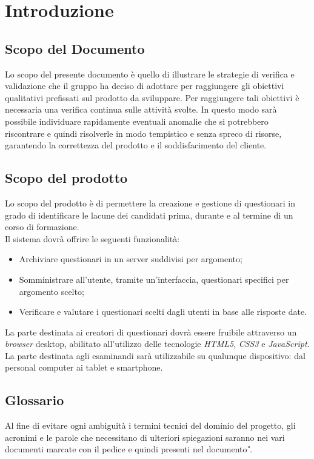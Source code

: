 \newpage
\section{Introduzione}
\subsection{Scopo del Documento}
Lo scopo del presente documento è quello di illustrare le strategie di verifica e validazione che il gruppo \gruppo \hspace{1mm} ha deciso di adottare per raggiungere gli obiettivi qualitativi prefissati sul prodotto da sviluppare. Per raggiungere tali obiettivi è necessaria una verifica continua sulle attività svolte. In questo modo sarà possibile individuare rapidamente eventuali anomalie che si potrebbero riscontrare e quindi risolverle in modo tempistico e senza spreco di risorse, garantendo la correttezza del prodotto e il soddisfacimento del cliente.

\subsection{Scopo del prodotto}
Lo scopo del prodotto è di permettere la creazione e gestione di questionari in grado di identificare le lacune dei candidati prima, durante e al termine di un corso di formazione. 
\\Il sistema dovrà offrire le seguenti funzionalità:
\begin{itemize}
	\item
	Archiviare questionari in un server suddivisi per argomento;
	\item
	Somministrare all'utente, tramite un'interfaccia, questionari specifici per argomento scelto;
	\item
	Verificare e valutare i questionari scelti dagli utenti in base alle risposte date.
\end{itemize}
La parte destinata ai creatori di questionari dovrà essere fruibile attraverso un \textit{browser} desktop, abilitato all'utilizzo delle tecnologie \textit{HTML5}, \textit{CSS3} e \textit{JavaScript}. La parte destinata agli esaminandi sarà utilizzabile su qualunque dispositivo: dal personal computer ai tablet e smartphone.

\subsection{Glossario}
Al fine di evitare ogni ambiguità i termini tecnici del dominio del progetto, gli acronimi e le parole che necessitano di ulteriori spiegazioni saranno nei vari documenti marcate con il pedice  e quindi presenti nel documento \textit{\G}.
